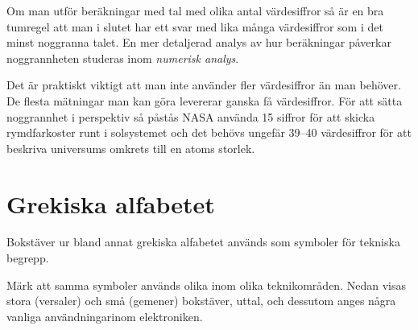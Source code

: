 Om man utför beräkningar med tal med olika antal värdesiffror så är en
bra tumregel att man i slutet har ett svar med lika många värdesiffror som i det
minst noggranna talet.
En mer detaljerad analys av hur beräkningar påverkar noggrannheten studeras inom
\emph{numerisk analys}.

Det är praktiskt viktigt att man inte använder fler värdesiffror än
man behöver.
De flesta mätningar man kan göra levererar ganska få värdesiffror.
För att sätta noggrannhet i perspektiv så påstås NASA använda 15 siffror för att
skicka rymdfarkoster runt i solsystemet och det behövs ungefär 39--40
värdesiffror för att beskriva universums omkrets till en atoms storlek.




\newpage
\section{Grekiska alfabetet}

Bokstäver ur bland annat grekiska alfabetet används som symboler för
tekniska begrepp.

Märk att samma symboler används olika inom olika teknikområden. Nedan
visas stora (versaler) och små (gemener) bokstäver, uttal, och
dessutom anges några vanliga användningarinom elektroniken.


